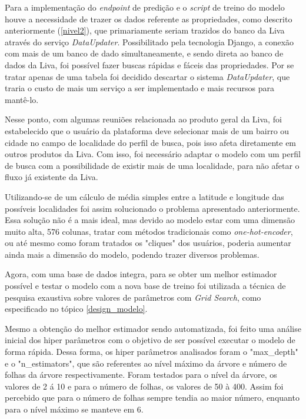 Para a implementação do \textit{endpoint} de predição e o \textit{script} de treino do modelo houve a necessidade de trazer os dados referente as propriedades, como descrito anteriormente (\ref{nivel2}), que primariamente seriam trazidos do banco da Liva através do serviço \textit{DataUpdater}. Possibilitado pela tecnologia Django, a conexão com mais de um banco de dado simultaneamente, e sendo direta ao banco de dados da Liva, foi possível fazer buscas rápidas e fáceis das propriedades. Por se tratar apenas de uma tabela foi decidido descartar o sistema \textit{DataUpdater}, que traria o custo de mais um serviço a ser implementado e mais recursos para mantê-lo.

Nesse ponto, com algumas reuniões relacionada ao produto geral da Liva, foi estabelecido que o usuário da plataforma deve selecionar mais de um bairro ou cidade no campo de localidade do perfil de busca, pois isso afeta diretamente em outros produtos da Liva. Com isso, foi necessário adaptar o modelo com um perfil de busca com a possibilidade de existir mais de uma localidade, para não afetar o fluxo já existente da Liva.

Utilizando-se de um cálculo de média simples entre a latitude e longitude das possíveis localidades foi assim solucionado o problema apresentado anteriormente. Essa solução não é a mais ideal, mas devido ao modelo estar com uma dimensão muito alta, 576 colunas, tratar com métodos tradicionais como \textit{one-hot-encoder}, ou até mesmo como foram tratados os "cliques" dos usuários, poderia aumentar ainda mais a dimensão do modelo, podendo trazer diversos problemas.

Agora, com uma base de dados integra, para se obter um melhor estimador possível e testar o modelo com a nova base de treino foi utilizada a técnica de pesquisa exaustiva sobre valores de parâmetros com \textit{Grid Search}, como especificado no tópico \ref{design_modelo}.

Mesmo a obtenção do melhor estimador sendo automatizada, foi feito uma análise inicial dos hiper parâmetros com o objetivo de ser possível executar o modelo de forma rápida. Dessa forma, os hiper parâmetros analisados foram o "max\_depth" e o "n\_estimators", que são referentes ao nível máximo da árvore e número de folhas da árvore respectivamente. Foram testados para o nível da árvore, os valores de 2 á 10 e para o número de folhas, os valores de 50 à 400. Assim foi percebido que para o número de folhas sempre tendia ao maior número, enquanto para o nível máximo se manteve em 6.

